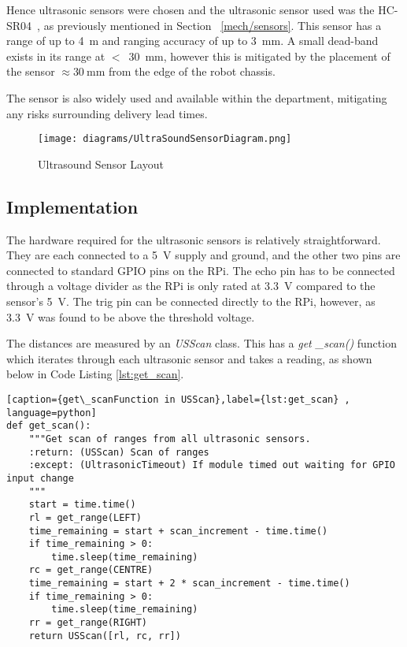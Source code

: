 Hence ultrasonic sensors were chosen and the ultrasonic sensor used was 
the HC-SR04~\cite{HCSR04datasheet}, as previously mentioned in Section~
\ref{mech/sensors}. This sensor has a range of up to \SI{4}{\m} and 
ranging accuracy of up to \SI{3}{\mm}. A small dead-band exists in its 
range at $<$~\SI{30}{\mm}, however this is mitigated by the placement of 
the sensor $\approx{\SI{30}{\mm}}$ from the edge of the robot chassis. 


The sensor is also widely used and available within the 
department, mitigating any risks surrounding delivery lead times. 

\begin{figure}[!ht]
	\centering
	\texttt{[image: diagrams/UltraSoundSensorDiagram.png]}
	\caption{Ultrasound Sensor Layout}\label{UltraSoundSensorDiagram}

\end{figure}

\subsection{Implementation}\label{elec/range/impl}
The hardware required for the ultrasonic sensors is relatively straightforward. 
They are each connected to a \SI{5}{\volt} supply and ground, and the other two pins are 
connected to standard GPIO pins on the RPi. The echo pin has to be connected through 
a voltage divider as the RPi is only rated at \SI{3.3}{\volt} compared to the sensor's \SI{5}{\volt}. The 
trig pin can be connected directly to the RPi, however, as \SI{3.3}{\volt} was found to be above 
the threshold voltage.

The distances are measured by an \textit{USScan} class. This has a \textit{get
\_scan()} function which iterates through each ultrasonic sensor and takes a reading, 
as shown below in Code Listing \ref{lst:get_scan}.

\begin{lstlisting}[caption={get\_scanFunction in USScan},label={lst:get_scan} , language=python]
def get_scan():
    """Get scan of ranges from all ultrasonic sensors.
    :return: (USScan) Scan of ranges
    :except: (UltrasonicTimeout) If module timed out waiting for GPIO input change
    """
    start = time.time()
    rl = get_range(LEFT)
    time_remaining = start + scan_increment - time.time()
    if time_remaining > 0:
        time.sleep(time_remaining)
    rc = get_range(CENTRE)
    time_remaining = start + 2 * scan_increment - time.time()
    if time_remaining > 0:
        time.sleep(time_remaining)
    rr = get_range(RIGHT)
    return USScan([rl, rc, rr])
\end{lstlisting}

